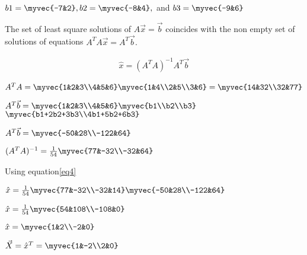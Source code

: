 \documentclass[journal,12pt,twocolumn]{IEEEtran}
\begin{document}
$b1=\myvec{-7&2}, b2=\myvec{-8&4}, $ and $b3=\myvec{-9&6}$

The set of least square solutions of $A\vec{x}=\vec{b}$ coincides with the non empty set of solutions of equations $A^TA\vec{x}=A^T\vec{b}.$ 

\begin{align}\label{eq4}
 \hat{x}=(A^TA)^{-1}A^T\vec{b} 
\end{align}

$A^TA=\myvec{1&2&3\\4&5&6}\myvec{1&4\\2&5\\3&6}=\myvec{14&32\\32&77}$

$A^T\vec{b}=\myvec{1&2&3\\4&5&6}\myvec{b1\\b2\\b3}$
$\myvec{b1+2b2+3b3\\4b1+5b2+6b3}$

$A^T\vec{b}=\myvec{-50&28\\-122&64}$

$(A^TA)^{-1}=\frac{1}{54}\myvec{77&-32\\-32&64}$

Using equation\eqref{eq4} 

$\hat{x}=\frac{1}{54}\myvec{77&-32\\-32&14}\myvec{-50&28\\-122&64}$

$\hat{x}=\frac{1}{54}\myvec{54&108\\-108&0}$

$\hat{x}=\myvec{1&2\\-2&0}$

$\vec{X}=\hat{x}^T=\myvec{1&-2\\2&0}$
\end{document}
